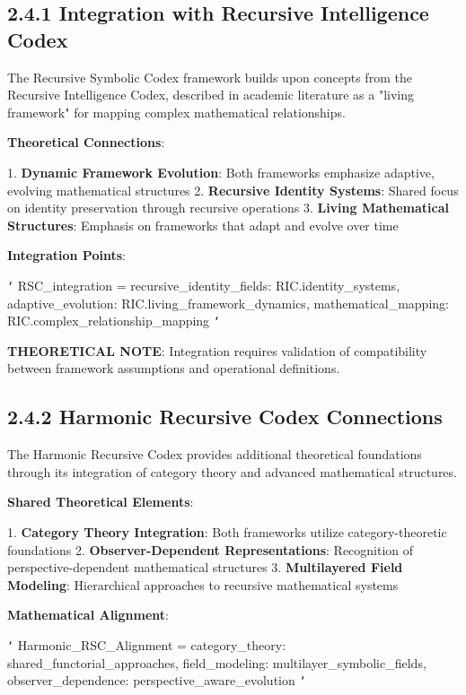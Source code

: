\subsection{2.4.1 Integration with Recursive Intelligence Codex}

The Recursive Symbolic Codex framework builds upon concepts from the Recursive Intelligence Codex, described in academic literature as a "living framework" for mapping complex mathematical relationships.

\textbf{Theoretical Connections}:

1. \textbf{Dynamic Framework Evolution}: Both frameworks emphasize adaptive, evolving mathematical structures
2. \textbf{Recursive Identity Systems}: Shared focus on identity preservation through recursive operations
3. \textbf{Living Mathematical Structures}: Emphasis on frameworks that adapt and evolve over time

\textbf{Integration Points}:

\texttt{`}
RSC_integration = {
    recursive_identity_fields: RIC.identity_systems,
    adaptive_evolution: RIC.living_framework_dynamics,
    mathematical_mapping: RIC.complex_relationship_mapping
}
\texttt{`}

\textbf{THEORETICAL NOTE}: Integration requires validation of compatibility between framework assumptions and operational definitions.

\subsection{2.4.2 Harmonic Recursive Codex Connections}

The Harmonic Recursive Codex provides additional theoretical foundations through its integration of category theory and advanced mathematical structures.

\textbf{Shared Theoretical Elements}:

1. \textbf{Category Theory Integration}: Both frameworks utilize category-theoretic foundations
2. \textbf{Observer-Dependent Representations}: Recognition of perspective-dependent mathematical structures
3. \textbf{Multilayered Field Modeling}: Hierarchical approaches to recursive mathematical systems

\textbf{Mathematical Alignment}:

\texttt{`}
Harmonic_RSC_Alignment = {
    category_theory: shared_functorial_approaches,
    field_modeling: multilayer_symbolic_fields,
    observer_dependence: perspective_aware_evolution
}
\texttt{`}

